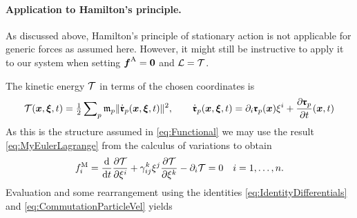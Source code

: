 \paragraph{Application to Hamilton's principle.}
As discussed above, Hamilton's principle of stationary action is not applicable for generic forces as assumed here.
However, it might still be instructive to apply it to our system when setting $\genForceImpressed=\tuple{0}$ and $\Lagrangian = \kineticEnergy$.

The kinetic energy $\kineticEnergy$ in terms of the chosen coordinates is
\begin{align}
 \kineticEnergy(\sysCoord, \sysVel, t)
 = \tfrac{1}{2} \sumParticles \particleMass{\PidxI} \norm{\particlePosd{\PidxI}(\sysCoord, \sysVel, t)}^2,
\qquad
 \particlePosd{\PidxI}(\sysCoord, \sysVel, t) = \dirDiff{\LidxI} \particlePos{\PidxI}(\sysCoord) \sysVelCoeff{\LidxI} + \pdiff[\particlePos{\PidxI}]{t}(\sysCoord, t)
\end{align}
As this is the structure assumed in \eqref{eq:Functional} we may use the result \eqref{eq:MyEulerLagrange} from the calculus of variations to obtain
\begin{align}\label{eq:ResHamiltonPrinciple}
 \genForceInertiaCoeff{\LidxI} 
 = \diff{t} \pdiff[\kineticEnergy]{\sysVelCoeff{\LidxI}} + \BoltzSym{\LidxIII}{\LidxI}{\LidxII} \sysVelCoeff{\LidxII} \pdiff[\kineticEnergy]{\sysVelCoeff{\LidxIII}} - \dirDiff{\LidxI} \kineticEnergy
 = 0
 \quad \LidxI = 1,\ldots,\dimConfigSpace.
\end{align}
Evaluation and some rearrangement using the identities \eqref{eq:IdentityDifferentials} and \eqref{eq:CommutationParticleVel} yields
